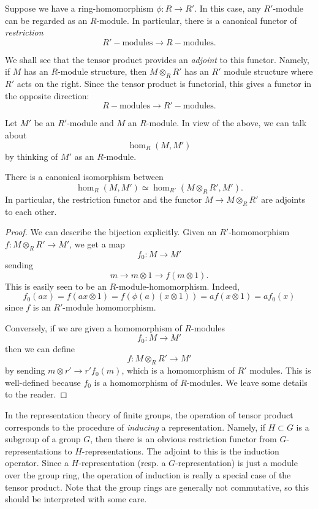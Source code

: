 Suppose we have a
ring-homomorphism $\phi:R \to R'$.  In this case, any $R'$-module can be
regarded as
an $R$-module.
In particular, there is a canonical functor of \emph{restriction}
\[ R'-\mathrm{modules} \to R-\mathrm{modules}.  \]

We shall see that the tensor product provides an \emph{adjoint} to this
functor.
Namely, if $M$ has an $R$-module
structure, then $M \otimes_R R'$ has an $R'$ module structure where $R'$ acts
on the right. Since the tensor product is functorial, this gives a functor
in the opposite direction:
\[ R-\mathrm{modules} \to R'-\mathrm{modules}.  \]


Let $M'$ be an $R'$-module and $M$ an $R$-module. In view of the above,
we can talk about
\[ \hom_R(M, M')  \]
by thinking of $M'$ as an $R$-module.

\begin{proposition}
There is a canonical isomorphism between
\[ \hom_R(M, M') \simeq \hom_{R'}(M \otimes_R R', M').  \]
In particular, the restriction functor and the functor $M \to M \otimes_R R'$
are adjoints to each other.
\end{proposition}


\begin{proof}
We can describe the bijection explicitly. Given an $R'$-homomorphism $f:M
\otimes_R R' \to M'$, we get a map
\[ f_0:M \to M'  \]
sending
\[ m \to m \otimes 1 \to f(m \otimes 1).  \]
This is easily seen to be an $R$-module-homomorphism. Indeed,
\[ f_0(ax) = f(ax \otimes 1) = f(\phi(a)(x \otimes 1)) = a f(x \otimes 1)  =
a f_0(x)  \]
since $f$ is an $R'$-module homomorphism.

Conversely, if we are given a homomorphism of $R$-modules
\[ f_0: M \to M'  \]
then we can define
\[ f: M \otimes_R R' \to M'  \]
by sending $m \otimes r' \to r' f_0(m)$, which is a homomorphism of $R'$
modules.
This is well-defined because $f_0$ is  a homomorphism of $R$-modules. We leave
some details to the reader.
\end{proof}

\begin{example}
In the representation theory of finite groups, the operation of tensor product
corresponds to the procedure of \emph{inducing} a representation. Namely, if
$H \subset G$ is a subgroup of a group $G$, then there is an obvious
restriction functor from $G$-representations to $H$-representations.
The adjoint to this is the induction operator. Since a $H$-representation
(resp. a $G$-representation) is just a module over the group ring, the
operation of induction is really a special case of the tensor product. Note
that the group rings are generally not commutative, so this should be
interpreted with some care.
\end{example}

